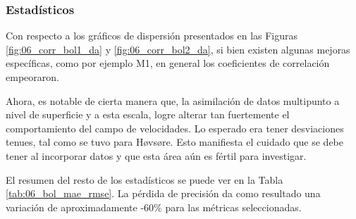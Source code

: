 \subsubsection{Estadísticos}
Con respecto a los gráficos de dispersión presentados en las Figuras \ref{fig:06_corr_bol1_da} y \ref{fig:06_corr_bol2_da}, si bien existen algunas mejoras específicas, como por ejemplo M1, en general los coeficientes de correlación empeoraron.  

Ahora, es notable de cierta manera que, la asimilación de datos multipunto a nivel de superficie y a esta escala, logre alterar tan fuertemente el comportamiento del campo de velocidades. Lo esperado era tener desviaciones tenues, tal como se tuvo para Høvsøre. Esto manifiesta el cuidado que se debe tener al incorporar datos y que esta área aún es fértil para investigar.

El resumen del resto de los estadísticos se puede ver en la Tabla \ref{tab:06_bol_mae_rmse}. La pérdida de precisión da como resultado una variación de aproximadamente -60\% para las métricas seleccionadas.

